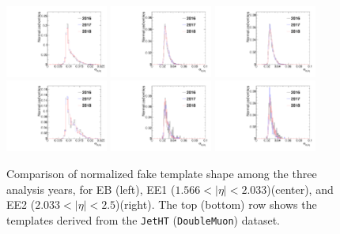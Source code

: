 \begin{figure}[!htbp]
\caption{Comparison of normalized fake template shape among the three analysis years, for EB (left), EE1 ($1.566 < |\eta| < 2.033$)(center), and EE2 ($2.033 < \lvert \eta \rvert< 2.5$)(right). The top (bottom) row shows the templates derived from the \texttt{JetHT} (\texttt{DoubleMuon}) dataset.}
\centering
\includegraphics[width=0.3\textwidth]{fig/sieie_comparison_EB_jetht_pt130To150_chIso5To10.pdf}
\includegraphics[width=0.3\textwidth]{fig/sieie_comparison_EE1_jetht_pt130To150_chIso5To10.pdf}
\includegraphics[width=0.3\textwidth]{fig/sieie_comparison_EE2_jetht_pt130To150_chIso5To10.pdf}\\
\includegraphics[width=0.3\textwidth]{fig/sieie_comparison_EB_doublemuon_pt130To150_chIso5To10.pdf}
\includegraphics[width=0.3\textwidth]{fig/sieie_comparison_EE1_doublemuon_pt130To150_chIso5To10.pdf}
\includegraphics[width=0.3\textwidth]{fig/sieie_comparison_EE2_doublemuon_pt130To150_chIso5To10.pdf}
\label{fig:fake_templates_by_year}
\end{figure}


